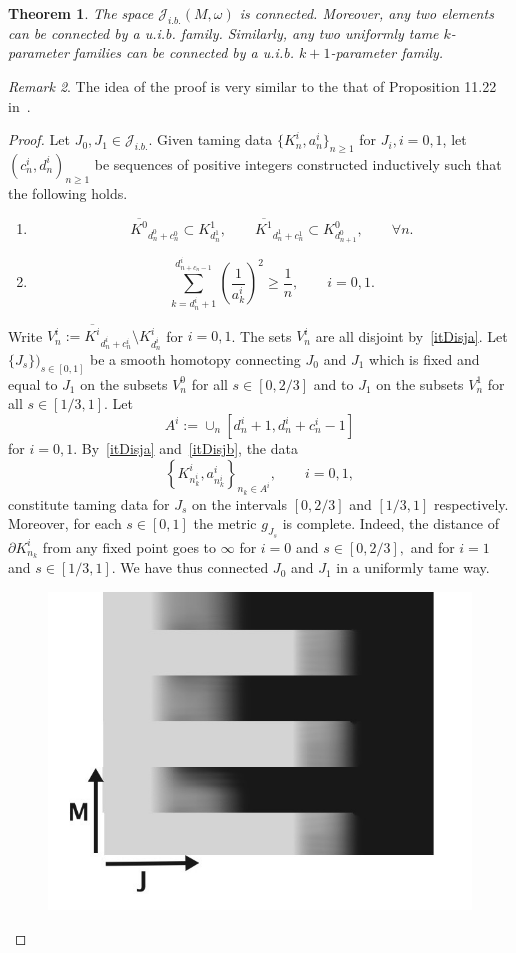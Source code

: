 \documentclass[11pt]{amsart}
\newtheorem{tm}{Theorem}[section]
\theoremstyle{definition}
\theoremstyle{remark}
\newtheorem{rem}[tm]{Remark}
\begin{document}
\begin{tm}\label{tmWeakTameCont}
The space $\mathcal{J}_{i.b.}(M,\omega)$ is connected. Moreover, any two elements can be connected by a u.i.b. family. Similarly, any two uniformly  tame $k$-parameter families can be connected by a u.i.b. $k+1$-parameter family.
\end{tm}
\begin{rem}
The idea of the proof is very similar to the that of Proposition 11.22 in~\cite{CielEli}.
\end{rem}
\begin{proof}
Let $J_0,J_1\in\mathcal{J}_{i.b.}$. Given taming  data $\{K^i_n,a^i_n\}_{n\geq 1}$ for $J_i,i=0,1$, let $(c^i_n,d^i_n)_{n\geq 1}$ be sequences of positive integers constructed inductively such that the following holds.
\begin{enumerate}
\item\label{itDisja}
\[
\overline{K^0}_{d^0_n+c^0_n}\subset K^1_{d^1_n},\qquad \overline{K^1}_{d^1_n+c^1_n}\subset K^0_{d^0_{n+1}},\qquad\forall n.
\]
\item\label{itDisjb}
\[
\sum_{k=d^i_n+1}^{d^i_{n+c_n-1}}\left(\frac1{a^i_k}\right)^2\geq\frac1{n},\qquad i=0,1.
\]
\end{enumerate}
Write $V^i_n:=\overline{K^i}_{d^i_n+c^i_n}\setminus K^i_{d^i_n}$ for $i=0,1$. The sets $V^i_n$ are all disjoint by~\ref{itDisja}.  Let $\{J_s\})_{s\in[0,1]}$ be a smooth homotopy connecting $J_0$ and $J_1$ which is fixed and equal to $J_1$ on the subsets $V^0_n$ for all $s\in[0,2/3]$ and to $J_1$ on the subsets $V^1_n$ for all $s\in[1/3,1].$ Let
\[
A^i:=\cup_n[d^i_n+1,d^i_n+c^i_n-1]
\]
for $i=0,1$.  By~\ref{itDisja} and~\ref{itDisjb}, the data
\[
\left\{K^i_{n^i_k},a^i_{n^i_k}\right\}_{n_k\in A^i},\qquad i=0,1,
\]
constitute taming data for $J_s$ on the intervals $[0,2/3]$ and $[1/3,1]$ respectively. Moreover, for each $s\in[0,1]$ the metric $g_{J_s}$ is complete. Indeed, the  distance of  $\partial K^i_{n_k}$ from any fixed point goes to $\infty$ for $i=0$ and $s\in[0,2/3],$ and for $i=1$ and $s\in [1/3,1]$. We have thus connected $J_0$ and $J_1$ in a uniformly tame way.
\begin{figure}[h]
\includegraphics[scale=0.5]{Zig-Zag-Homotopy}

\end{figure}
\end{proof}
\end{document}
